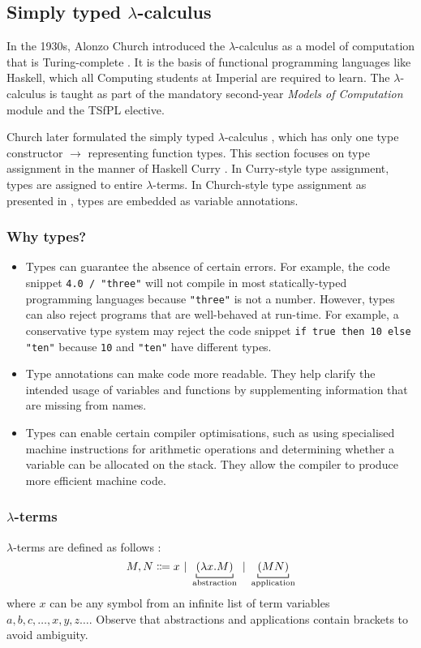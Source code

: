 \subsection{Simply typed \texorpdfstring{$\lambda$-calculus}{Lambda Calculus}}
In the 1930s, Alonzo Church introduced the $\lambda$-calculus \cite{church:1936} as a model of computation that is Turing-complete \cite{turing:1937}. It is the basis of functional programming languages like Haskell, which all Computing students at Imperial are required to learn. The $\lambda$-calculus is taught as part of the mandatory second-year \textit{Models of Computation} module and the TSfPL elective.

Church later formulated the simply typed $\lambda$-calculus \cite{church:1940}, which has only one type constructor $\to$ representing function types. This section focuses on type assignment in the manner of Haskell Curry \cite{curry:1934}. In Curry-style type assignment, types are assigned to entire $\lambda$-terms. In Church-style type assignment as presented in \cite{church:1940}, types are embedded as variable annotations. 

\subsubsection{Why types?}
\begin{itemize}
    \item Types can guarantee the absence of certain errors. For example, the code snippet \lstinline{4.0 / "three"} will not compile in most statically-typed programming languages because \lstinline{"three"} is not a number. However, types can also reject programs that are well-behaved at run-time. For example, a conservative type system may reject the code snippet \lstinline{if true then 10 else "ten"} because \lstinline{10} and \lstinline{"ten"} have different types.
    \item Type annotations can make code more readable. They help clarify the intended usage of variables and functions by supplementing information that are missing from names.
    \item Types can enable certain compiler optimisations, such as using specialised machine instructions for arithmetic operations and determining whether a variable can be allocated on the stack. They allow the compiler to produce more efficient machine code.
\end{itemize}

\subsubsection{\texorpdfstring{$\lambda$}{Lambda}-terms}
\label{lambda:lambda-terms}
$\lambda$-terms are defined as follows \cite{church:1941}:
\[
    M,N \Coloneqq x \alt \underbracket[0.6pt]{(\lambda x. M)}_\text{abstraction} \alt \underbracket[0.6pt]{(MN)}_\text{application}
\]
where $x$ can be any symbol from an infinite list of term variables $a, b, c, \ldots, x, y, z \ldots$. Observe that abstractions and applications contain brackets to avoid ambiguity.


